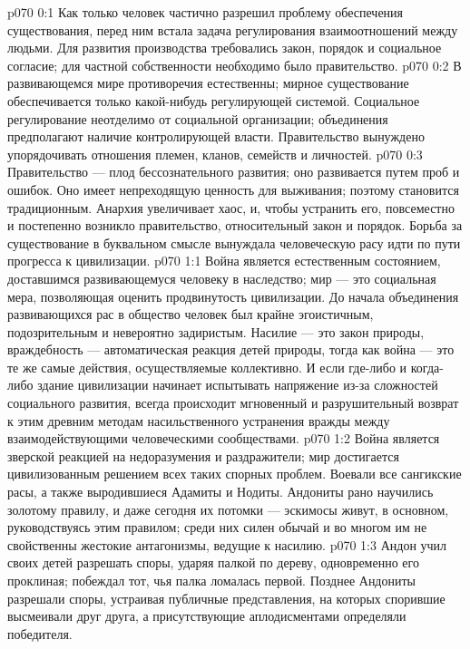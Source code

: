 \vs p070 0:1 Как только человек частично разрешил проблему обеспечения существования, перед ним встала задача регулирования взаимоотношений между людьми. Для развития производства требовались закон, порядок и социальное согласие; для частной собственности необходимо было правительство.
\vs p070 0:2 В развивающемся мире противоречия естественны; мирное существование обеспечивается только какой\hyp{}нибудь регулирующей системой. Социальное регулирование неотделимо от социальной организации; объединения предполагают наличие контролирующей власти. Правительство вынуждено упорядочивать отношения племен, кланов, семейств и личностей.
\vs p070 0:3 Правительство --- плод бессознательного развития; оно развивается путем проб и ошибок. Оно имеет непреходящую ценность для выживания; поэтому становится традиционным. Анархия увеличивает хаос, и, чтобы устранить его, повсеместно и постепенно возникло правительство, относительный закон и порядок. Борьба за существование в буквальном смысле вынуждала человеческую расу идти по пути прогресса к цивилизации.
\vs p070 1:1 Война является естественным состоянием, доставшимся развивающемуся человеку в наследство; мир --- это социальная мера, позволяющая оценить продвинутость цивилизации. До начала объединения развивающихся рас в общество человек был крайне эгоистичным, подозрительным и невероятно задиристым. Насилие --- это закон природы, враждебность --- автоматическая реакция детей природы, тогда как война --- это те же самые действия, осуществляемые коллективно. И если где\hyp{}либо и когда\hyp{}либо здание цивилизации начинает испытывать напряжение из\hyp{}за сложностей социального развития, всегда происходит мгновенный и разрушительный возврат к этим древним методам насильственного устранения вражды между взаимодействующими человеческими сообществами.
\vs p070 1:2 Война является зверской реакцией на недоразумения и раздражители; мир достигается цивилизованным решением всех таких спорных проблем. Воевали все сангикские расы, а также выродившиеся Адамиты и Нодиты. Андониты рано научились золотому правилу, и даже сегодня их потомки --- эскимосы живут, в основном, руководствуясь этим правилом; среди них силен обычай и во многом им не свойственны жестокие антагонизмы, ведущие к насилию.
\vs p070 1:3 Андон учил своих детей разрешать споры, ударяя палкой по дереву, одновременно его проклиная; побеждал тот, чья палка ломалась первой. Позднее Андониты разрешали споры, устраивая публичные представления, на которых спорившие высмеивали друг друга, а присутствующие аплодисментами определяли победителя.
